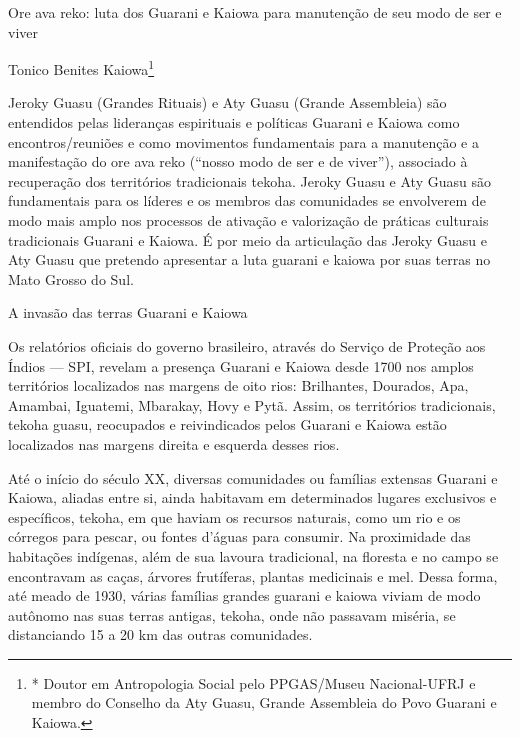 \documentclass{article}
\begin{document}
Ore ava reko: luta dos Guarani e Kaiowa para manuten\c{c}\~ao de seu
modo de ser e viver

Tonico Benites Kaiowa\footnote{* Doutor em Antropologia Social pelo
PPGAS/Museu Nacional-UFRJ e membro do Conselho da Aty Guasu, Grande
Assembleia do Povo Guarani e Kaiowa.}

Jeroky Guasu (Grandes Rituais) e Aty Guasu (Grande Assembleia) s\~ao
entendidos pelas lideran\c{c}as espirituais e pol\'iticas Guarani e
Kaiowa como encontros/reuni\~oes e como movimentos fundamentais para a
manuten\c{c}\~ao e a manifesta\c{c}\~ao do ore ava reko
({\textquotedblleft}nosso modo de ser e de viver{\textquotedblright}),
associado \`a recupera\c{c}\~ao dos territ\'orios tradicionais tekoha.
Jeroky Guasu e Aty Guasu s\~ao fundamentais para os l\'ideres e os
membros das comunidades se envolverem de modo mais amplo nos processos
de ativa\c{c}\~ao e valoriza\c{c}\~ao de pr\'aticas culturais
tradicionais Guarani e Kaiowa. \'E por meio da articula\c{c}\~ao das
Jeroky Guasu e Aty Guasu que pretendo apresentar a luta guarani e
kaiowa por suas terras no Mato Grosso do Sul. 

A invas\~ao das terras Guarani e Kaiowa

Os relat\'orios oficiais do governo brasileiro, atrav\'es do Servi\c{c}o
de Prote\c{c}\~ao aos \'Indios --- SPI, revelam a presen\c{c}a Guarani
e Kaiowa desde 1700 nos amplos territ\'orios localizados nas margens de
oito rios: Brilhantes, Dourados, Apa, Amambai, Iguatemi, Mbarakay, Hovy
e Pyt\~a. Assim, os territ\'orios tradicionais, tekoha guasu,
reocupados e reivindicados pelos Guarani e Kaiowa est\~ao localizados
nas margens direita e esquerda desses rios.

At\'e o in\'icio do s\'eculo XX, diversas comunidades ou fam\'ilias
extensas Guarani e Kaiowa, aliadas entre si, ainda habitavam em
determinados lugares exclusivos e espec\'ificos, tekoha, em que haviam
os recursos naturais, como um rio e os c\'orregos para pescar, ou
fontes d{\textquoteright}\'aguas para consumir. Na proximidade das
habita\c{c}\~oes ind\'igenas, al\'em de sua lavoura tradicional, na
floresta e no campo se encontravam as ca\c{c}as, \'arvores
frut\'iferas, plantas medicinais e mel. Dessa forma, at\'e meado de
1930, v\'arias fam\'ilias grandes guarani e kaiowa viviam de modo
aut\^onomo nas suas terras antigas, tekoha, onde n\~ao passavam
mis\'eria, se distanciando 15 a 20 km das outras comunidades.
\end{document}
